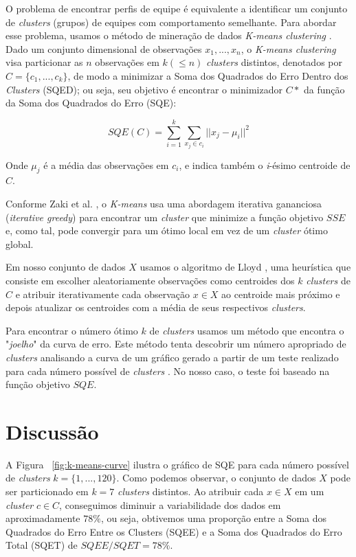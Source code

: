 O problema de encontrar perfis de equipe é equivalente a identificar um conjunto de \textit{clusters} (grupos) de equipes com comportamento semelhante. Para abordar esse problema, usamos o método de mineração de dados \textit{K-means clustering} \cite{zaki2014data}. Dado um conjunto dimensional de observações \(x_1, ..., x_n \), o \textit{K-means clustering} visa particionar as $n$ observações em $k (\leq n)$ \textit{clusters} distintos, denotados por $ C = \{c_1, ... , c_k \} $, de modo a minimizar a Soma dos Quadrados do Erro Dentro dos \textit{Clusters} (SQED); ou seja, seu objetivo é encontrar o minimizador $C*$ da função da Soma dos Quadrados do Erro (SQE):

\begin{displaymath}
  SQE(C) = \sum_{i=1}^{k} \sum_{x_j \in c_i}{} || x_j - \mu _i ||^2
\end{displaymath}

Onde $\mu_j$ é a média das observações em $c_i$, e indica também o \textit{i}-ésimo centroide de $C$.

Conforme Zaki et al. \cite{zaki2014data}, o \textit{K-means} usa uma abordagem iterativa gananciosa (\textit{iterative greedy}) para encontrar um \textit{cluster} que minimize a função objetivo $SSE$ e, como tal, pode convergir para um ótimo local em vez de um \textit{cluster} ótimo global.

Em nosso conjunto de dados $X$ usamos o algoritmo de Lloyd \cite{ong2015player}, uma heurística que consiste em escolher aleatoriamente observações como centroides dos $k$ \textit{clusters} de  $C$ e atribuir iterativamente cada observação $x \in X$ ao centroide mais próximo e depois atualizar os centroides com a média de seus respectivos \textit{clusters}.

Para encontrar o número ótimo $k$ de \textit{clusters} usamos um método que encontra o "\textit{joelho}" da curva de erro. Este método tenta descobrir um número apropriado de \textit{clusters} analisando a curva de um gráfico gerado a partir de um teste realizado para cada número possível de \textit{clusters} \cite{salvador2004determining}. No nosso caso, o teste foi baseado na função objetivo $SQE$.

\section{Discussão}

A Figura ~\ref{fig:k-means-curve} ilustra o gráfico de SQE para cada número possível de \textit{clusters} $k = \{1, ..., 120\}$. Como podemos observar, o conjunto de dados $X$ pode ser particionado em $k=7$ \textit{clusters} distintos. Ao atribuir cada $x \in X$ em um \textit{cluster} $c \in C$, conseguimos diminuir a variabilidade dos dados em aproximadamente $78\%$, ou seja, obtivemos uma proporção entre a Soma dos Quadrados do Erro Entre os Clusters (SQEE) e a Soma dos Quadrados do Erro Total (SQET) de $SQEE/SQET = 78 \%$.

